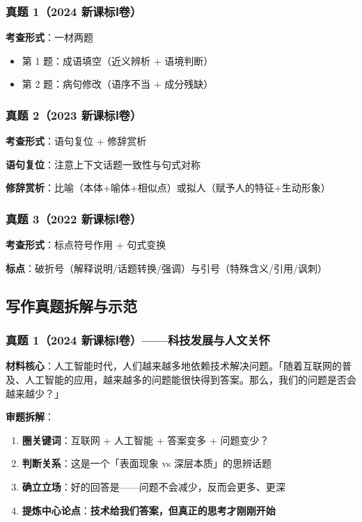 \subsubsection{真题 1（2024 新课标Ⅰ卷）}

\textbf{考查形式}：一材两题

\begin{itemize}
  \item 第 1 题：成语填空（近义辨析 + 语境判断）
  \item 第 2 题：病句修改（语序不当 + 成分残缺）
\end{itemize}

\subsubsection{真题 2（2023 新课标Ⅰ卷）}

\textbf{考查形式}：语句复位 + 修辞赏析

\textbf{语句复位}：注意上下文话题一致性与句式对称

\textbf{修辞赏析}：比喻（本体+喻体+相似点）或拟人（赋予人的特征+生动形象）

\subsubsection{真题 3（2022 新课标Ⅰ卷）}

\textbf{考查形式}：标点符号作用 + 句式变换

\textbf{标点}：破折号（解释说明/话题转换/强调）与引号（特殊含义/引用/讽刺）

\subsection{写作真题拆解与示范}

\subsubsection{真题 1（2024 新课标Ⅰ卷）——科技发展与人文关怀}

\textbf{材料核心}：人工智能时代，人们越来越多地依赖技术解决问题。「随着互联网的普及、人工智能的应用，越来越多的问题能很快得到答案。那么，我们的问题是否会越来越少？」

\textbf{审题拆解}：

\begin{enumerate}
  \item \textbf{圈关键词}：互联网 + 人工智能 + 答案变多 + 问题变少？
  \item \textbf{判断关系}：这是一个「表面现象 vs 深层本质」的思辨话题
  \item \textbf{确立立场}：好的回答是——问题不会减少，反而会更多、更深
  \item \textbf{提炼中心论点}：\textbf{技术给我们答案，但真正的思考才刚刚开始}
\end{enumerate}

